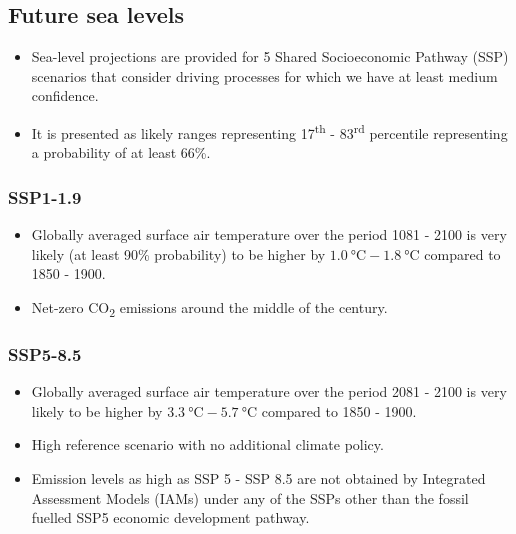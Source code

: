 \documentclass[11pt]{article}
\begin{document}
\newpage

\subsection{Future sea levels}
\label{sec:orgae81873}
\begin{itemize}
\item Sea-level projections are provided for 5 Shared Socioeconomic Pathway (SSP) scenarios that consider driving processes for which we have at least medium confidence.
\item It is presented as likely ranges representing 17\textsuperscript{th} - 83\textsuperscript{rd} percentile representing a probability of at least 66\%.
\end{itemize}

\subsubsection{SSP1-1.9}
\label{sec:org831d2f0}
\begin{itemize}
\item Globally averaged surface air temperature over the period 1081 - 2100 is very likely (at least 90\% probability) to be higher by \(\qty{1.0}{\degreeCelsius} - \qty{1.8}{\degreeCelsius}\) compared to 1850 - 1900.
\item Net-zero CO\textsubscript{2} emissions around the middle of the century.
\end{itemize}


\subsubsection{SSP5-8.5}
\label{sec:org19bfdcc}
\begin{itemize}
\item Globally averaged surface air temperature over the period 2081 - 2100 is very likely to be higher by \(\qty{3.3}{\degreeCelsius} - \qty{5.7}{\degreeCelsius}\) compared to 1850 - 1900.
\item High reference scenario with no additional climate policy.
\item Emission levels as high as SSP 5 - SSP 8.5 are not obtained by Integrated Assessment Models (IAMs) under any of the SSPs other than the fossil fuelled SSP5 economic development pathway.
\end{itemize}
\end{document}

